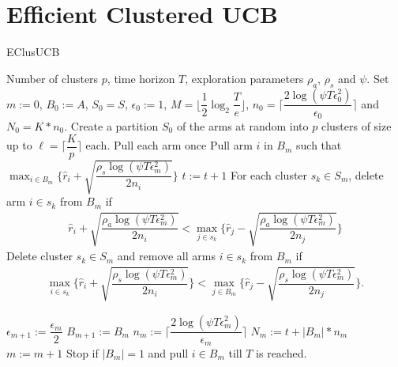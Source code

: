 \section{Efficient Clustered UCB}

\begin{algorithm}[t]
\caption{EClusUCB}
\label{alg:eclusucb}
\begin{algorithmic}
 Number of clusters $p$, time horizon $T$, exploration parameters $\rho_a$, $\rho_s$ and $\psi$.
 Set $m:=0$, $B_{0}:=A$, $S_0 = S$, $\epsilon_{0}:=1$, $M=\big \lfloor \dfrac{1}{2}\log_{2} \dfrac{T}{e}\big\rfloor$, $n_{0}=\bigg\lceil\dfrac{2\log{(\psi T\epsilon_{0}^{2})}}{\epsilon_{0}}\bigg\rceil$ and  $N_{0}=K*n_{0}$.
\State Create a partition $S_0$ of the arms at random into $p$ clusters of size up to $\ell=\bigg\lceil \dfrac{K}{p} \bigg\rceil$ each.
\State Pull each arm once
\State Pull arm $i$ in $B_m$ such that $\max_{i\in B_{m}}\bigg\lbrace \hat{r}_{i} + \sqrt{\dfrac{\rho_{s}\log{(\psi T\epsilon_{m}^{2})}}{2 n_{i}}} \bigg\rbrace$
\State $t:=t+1$
\ArmElim
\State For each cluster $s_k \in S_{m}$, delete arm ${i}\in s_{k}$ from $B_{m}$ if
\begin{align*}
\hat{r}_{i} + \sqrt{\dfrac{\rho_{a}\log{(\psi T\epsilon_{m}^{2})}}{2 n_{i}}}  < \max_{{j}\in s_{k}}\bigg\lbrace\hat{r}_{j} -\sqrt{\dfrac{\rho_{a}\log{(\psi T\epsilon_{m}^{2})}}{2 n_{j}}} \bigg\rbrace
\end{align*}
\EndArmElim
\ClusElim
\State Delete cluster $s_{k}\in S_{m}$ and remove all arms $i\in s_{k}$ from $B_{m}$ if 
\begin{align*}
 \max_{{i}\in s_{k}}\bigg\lbrace\hat{r}_{i} + \sqrt{\dfrac{\rho_{s}\log{(\psi T\epsilon_{m}^{2})}}{2 n_{i}}}\bigg\rbrace 
 < \max_{{j}\in B_{m}} \bigg\lbrace\hat{r}_{j} - \sqrt{\dfrac{\rho_{s} \log{(\psi T\epsilon_{m}^{2})}}{2 n_{j}}}\bigg\rbrace.
\end{align*}
\EndClusElim

\ResParam
\State $\epsilon_{m+1}:=\dfrac{\epsilon_{m}}{2}$\vspace{0.5ex}
\State $B_{m+1}:=B_{m}$
\State $n_{m}:=\bigg\lceil\dfrac{2\log{(\psi T\epsilon_{m}^{2})}}{\epsilon_{m}}\bigg\rceil$
\State $N_{m}:=t+|B_{m}| * n_{m}$
\State $m:=m+1$
\EndResParam
\State Stop if $|B_{m}|=1$ and pull ${i}\in B_{m}$ till $T$ is reached.
\EndIf
\EndFor
\end{algorithmic}
\end{algorithm}

